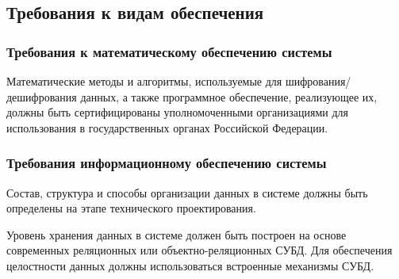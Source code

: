 \documentclass[russian, utf8, 12pt,pointsubsection,floatsubsection]{eskdtext}
\begin{document}
\subsection{Требования к видам обеспечения}
\subsubsection{Требования к математическому обеспечению системы}
Математические методы и алгоритмы, используемые для шифрования/дешифрования данных, а также программное обеспечение, реализующее их, должны быть сертифицированы уполномоченными организациями для использования в государственных органах Российской Федерации.
\subsubsection{Требования информационному обеспечению системы}
Состав, структура и способы организации данных в системе должны быть определены на этапе технического проектирования.

Уровень хранения данных в системе должен быть построен на основе современных реляционных или объектно-реляционных СУБД. Для обеспечения целостности данных должны использоваться встроенные механизмы СУБД.
\end{document}
